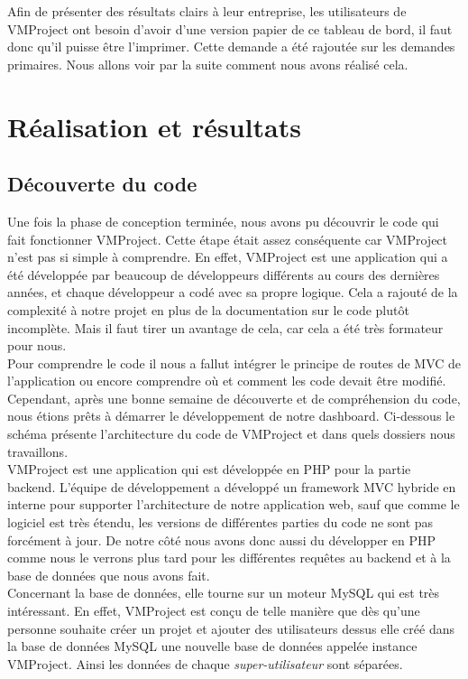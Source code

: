 \documentclass[12pt]{report}
\begin{document}
Afin de présenter des résultats clairs à leur entreprise, les utilisateurs de VMProject ont besoin d’avoir d’une version papier de ce tableau de bord, il faut donc qu’il puisse être l’imprimer. Cette demande a été rajoutée sur les demandes primaires. Nous allons voir par la suite comment nous avons réalisé cela.

\chapter{Réalisation et résultats}

	\section{Découverte du code}
Une fois la phase de conception terminée, nous avons pu découvrir le code qui fait fonctionner VMProject. Cette étape était assez conséquente car VMProject n’est pas si simple à comprendre. En effet, VMProject est une application qui a été développée par beaucoup de développeurs différents au cours des dernières années, et chaque développeur a codé avec sa propre logique. Cela a rajouté de la complexité à notre projet en plus de la documentation sur le code plutôt incomplète. Mais il faut tirer un avantage de cela, car cela a été très formateur pour nous.\\

 Pour comprendre le code il nous a fallut intégrer le principe de routes de MVC de l'application ou encore comprendre où et comment les code devait être modifié. Cependant, après une bonne semaine de découverte et de compréhension du code, nous étions prêts à démarrer le développement de notre dashboard. Ci-dessous le schéma présente l'architecture du code de VMProject et dans quels dossiers nous travaillons.\\


VMProject est une application qui est développée en PHP pour la partie backend. L'équipe de développement a développé un framework MVC hybride en interne pour supporter l'architecture de notre application web, sauf que comme le logiciel est très étendu, les versions de différentes parties du code ne sont pas forcément à jour. De notre côté nous avons donc aussi du développer en PHP comme nous le verrons plus tard pour les différentes requêtes au backend et à la base de données que nous avons fait.\\

Concernant la base de données, elle tourne sur un moteur MySQL qui est très intéressant. En effet, VMProject est conçu de telle manière que dès qu'une personne souhaite créer un projet et ajouter des utilisateurs dessus elle créé dans la base de données MySQL une nouvelle base de données appelée instance VMProject. Ainsi les données de chaque \emph{super-utilisateur} sont séparées.\\
\end{document}
